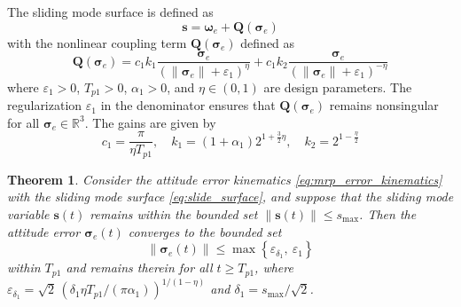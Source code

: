 \documentclass[journal]{new-aiaa}
\newtheorem{theorem}{Theorem}
\begin{document}
The sliding mode surface is defined as
\begin{equation}
\boldsymbol{s} = \boldsymbol{\omega}_e + \boldsymbol{Q}(\boldsymbol{\sigma}_e)
\label{eq:slide_surface}
\end{equation}
with the nonlinear coupling term $\boldsymbol{Q}(\boldsymbol{\sigma}_e)$ defined as
\begin{equation}
\boldsymbol{Q}(\boldsymbol{\sigma}_e) 
= c_1 k_1 \frac{\boldsymbol{\sigma}_e}{(\|\boldsymbol{\sigma}_e\| + \varepsilon_1)^\eta}
+ c_1 k_2 \frac{\boldsymbol{\sigma}_e}{(\|\boldsymbol{\sigma}_e\| + \varepsilon_1)^{-\eta}}
\end{equation}
where $\varepsilon_1 > 0$, $T_{p1} > 0$, $\alpha_1 > 0$, and $\eta\in(0,1)$ are design parameters. The regularization $\varepsilon_1$ in the denominator ensures that $\boldsymbol{Q}(\boldsymbol{\sigma}_e)$ remains nonsingular for all $\boldsymbol{\sigma}_e\in\mathbb{R}^3$. The gains are given by
\[
c_1 = \frac{\pi}{\eta T_{p1}}, \quad
k_1 = (1 + \alpha_1) 2^{1 + \frac{3}{2}\eta}, \quad
k_2 = 2^{1 - \frac{\eta}{2}}
\]

\begin{theorem}
\label{thm:attitude_convergence}
Consider the attitude error kinematics \eqref{eq:mrp_error_kinematics} with the sliding mode surface \eqref{eq:slide_surface}, 
and suppose that the sliding mode variable $\boldsymbol{s}(t)$ remains within the bounded set $\|\boldsymbol{s}(t)\| \le s_{\max}$. 
Then the attitude error $\boldsymbol{\sigma}_e(t)$ converges to the bounded set
\begin{equation}
\|\boldsymbol{\sigma}_e(t)\| \le \max\left\{ \varepsilon_{\delta_1},\ \varepsilon_1 \right\}
\end{equation}
within $T_{p1}$ and remains therein for all $t\ge T_{p1}$, where
$\varepsilon_{\delta_1} = \sqrt{2}\,( \delta_1 \eta T_{p1} / (\pi \alpha_1) )^{1/(1-\eta)}$
and $\delta_1 = s_{\max}/\sqrt{2}$.
\end{theorem}
\end{document}
